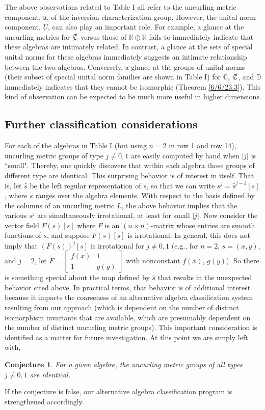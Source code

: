 \documentclass{amsart}
\numberwithin{equation}{section}
\newtheorem*{conjecture}{Conjecture}
\theoremstyle{definition}
\numberwithin{theorem}{section}
\begin{document}
The above observations related to Table I all refer to the uncurling metric component, $\mathfrak{u}$, of the inversion characterization group.  However, the unital norm component, $U$, can also play an important role.  For example, a glance at the uncurling metrics for $\slashed{\mathbb{C}}$ versus those of $\mathbb{R}\oplus\mathbb{R}$ fails to immediately indicate that these algebras are intimately related.   In contrast, a glance at the sets of special unital norms for these algebras immediately suggests an intimate relationship between the two algebras. Conversely, a glance at the groups of unital norms (their subset of special unital norm families are shown in Table I) for $\mathbb{C}$, $\slashed{\mathbb{C}}$, and $\mathbb{D}$ immediately
\enlargethispage{1cm} indicates that they cannot be isomorphic (Theorem \ref{6/6/23.3}).  This kind of observation can be expected to be much more useful in higher dimensions.

\subsection{Further classification considerations} For each of the algebras in Table I (but using $n=2$ in row 1 and row 14), uncurling metric groups of type $j\ne 0,1$ are easily computed by hand when  $|j|$ is ``small".  
Thereby, one quickly discovers that within each algebra those groups of different type are identical.  This surprising behavior is of interest in itself.  That is, let $\hat{s}$ be the left regular representation of $s$, so that we can write $s^j = \hat{s}^{j-1}[s]$, where $s$ ranges over the algebra elements. With respect to the basis defined by the columns of an uncurling metric $L$, the above behavior implies that the various $s^j$ are simultaneously irrotational, at least for small $|j|$.  Now consider the vector field $F(s)[s]$ where $F$ is an \mbox{$(n\times n)$-matrix} whose entries are smooth functions of $s$, and suppose $F(s)[s]$ is irrotational.  In general, this does not imply that $(F(s))^j[s]$ is irrotational for $j\ne 0,1$ (e.g., for \mbox{$n=2$}, $s=(x,y)$, and $j=2$, let $F= \left[\begin{array}{ccc}
 f(x) & 1   \\ 
 1 & g(y)    
\end{array}\right]$ with nonconstant $f(x)$, $g(y)$).  So there is something special about the map defined by $\hat{s}$ that results in the unexpected behavior cited above. 
In practical terms, that behavior is of additional interest because it impacts the coarseness of an alternative algebra classification system resulting from our approach (which is dependent on the number of distinct isomorphism invariants that are available, which are presumably dependent on the number of distinct uncurling metric groups).  This important consideration is identified as a matter for future investigation. At this point we are simply left with,
\begin{conjecture} For a given algebra, the uncurling metric groups of all types $j\ne 0,1$ are identical. 
\end{conjecture}
\noindent If the conjecture is false, our alternative algebra classification program is strengthened accordingly.
\end{document}
